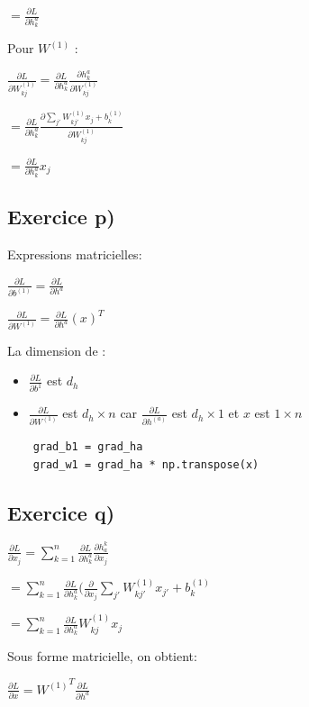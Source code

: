 \documentclass[a4paper,10pt]{article}
\begin{document}
$ = \frac{\partial L}{\partial h^{a}_{k}}$

Pour $W^{(1)}$ :

$\frac{\partial L}{\partial W^{(1)}_{kj}} = \frac{\partial L}{\partial h^{a}_{k}} \frac{\partial h^{a}_{k}}{\partial W^{(1)}_{kj}} $

$ = \frac{\partial L}{\partial h^{a}_{k}} \frac{\partial \sum_{j'} W^{(1)}_{kj'} x_{j} + b^{(1)}_{k}}{\partial W^{(1)}_{kj}}$

$ = \frac{\partial L}{\partial h^{a}_{k}} x_{j} $


\subsection{Exercice p)}

Expressions matricielles:

$\frac{\partial L}{\partial b^{(1)}} = \frac{\partial L}{\partial h^a}$

$\frac{\partial L}{\partial W^{(1)}} = \frac{\partial L}{\partial h^a}(x)^T$

La dimension de :
\begin{itemize}
	\item $\frac{\partial L}{\partial b^{1}}$ est $d_{h}$
	\item $\frac{\partial L}{\partial W^{(1)}}$ est $d_{h} \times n$ car  $\frac{\partial L}{\partial h^{(a)}}$ est $d_{h} \times 1$ et $ x $ est $1 \times n$
\end{itemize}

\begin{verbatim}
	grad_b1 = grad_ha
	grad_w1 = grad_ha * np.transpose(x)
\end{verbatim}


\subsection{Exercice q)}

$\frac{\partial L}{\partial x_j} = \sum_{k=1}^{n} \frac{\partial L}{\partial h_k^a} \frac{\partial h_a^k}{\partial x_j}$

$ = \sum_{k=1}^{n} \frac{\partial L}{\partial h_k^a} (\frac{\partial }{\partial x_j} \sum_{j'} W^{(1)}_{kj'} x_{j'} + b^{(1)}_k$

$ = \sum_{k=1}^{n} \frac{\partial L}{\partial h_k^a} W^{(1)}_{kj} x_{j}$

Sous forme matricielle, on obtient:

$\frac{\partial L}{\partial x} = {W^{(1)}}^T \frac{\partial L}{\partial h^a}$
\end{document}
